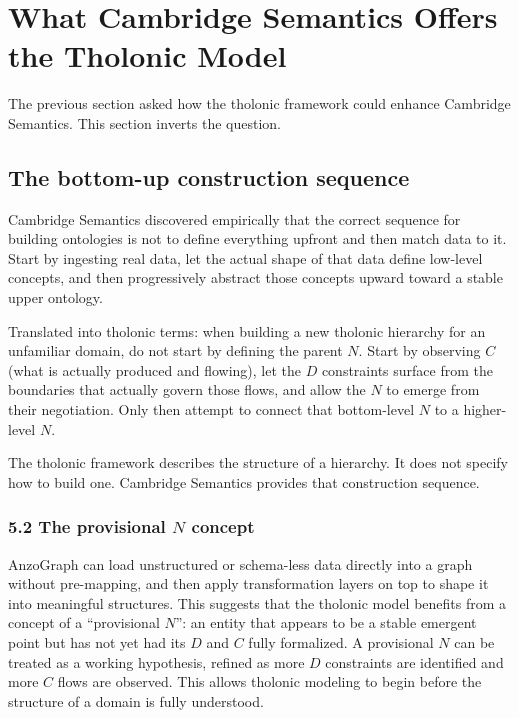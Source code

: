 \documentclass[12pt]{article}
\begin{document}
\section{What Cambridge Semantics Offers the Tholonic Model}\label{what-cambridge-semantics-offers-the-tholonic-model}

The previous section asked how the tholonic framework could enhance
Cambridge Semantics. This section inverts the question.

\subsection{The bottom-up construction sequence}\label{the-bottom-up-construction-sequence}

Cambridge Semantics discovered empirically that the correct sequence for
building ontologies is not to define everything upfront and then match
data to it. Start by ingesting real data, let the actual shape of that
data define low-level concepts, and then progressively abstract those
concepts upward toward a stable upper ontology.

Translated into tholonic terms: when building a new tholonic hierarchy
for an unfamiliar domain, do not start by defining the parent \(N\).
Start by observing \(C\) (what is actually produced and flowing), let
the \(D\) constraints surface from the boundaries that actually govern
those flows, and allow the \(N\) to emerge from their negotiation. Only
then attempt to connect that bottom-level \(N\) to a higher-level \(N\).

The tholonic framework describes the structure of a hierarchy. It does
not specify how to build one. Cambridge Semantics provides that
construction sequence.

\subsubsection{\texorpdfstring{5.2 The provisional \(N\)
concept}{5.2 The provisional N concept}}\label{the-provisional-n-concept}

AnzoGraph can load unstructured or schema-less data directly into a
graph without pre-mapping, and then apply transformation layers on top
to shape it into meaningful structures. This suggests that the tholonic
model benefits from a concept of a ``provisional \(N\)'': an entity that
appears to be a stable emergent point but has not yet had its \(D\) and
\(C\) fully formalized. A provisional \(N\) can be treated as a working
hypothesis, refined as more \(D\) constraints are identified and more
\(C\) flows are observed. This allows tholonic modeling to begin before
the structure of a domain is fully understood.
\end{document}

